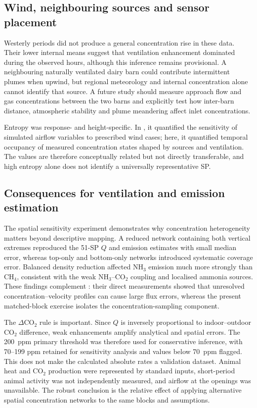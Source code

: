 ﻿\documentclass[12pt,a4paper]{article}
\begin{document}
\subsection{Wind, neighbouring sources and sensor placement}
Westerly periods did not produce a general concentration rise in these data. Their lower internal means suggest that ventilation enhancement dominated during the observed hours, although this inference remains provisional. A neighbouring naturally ventilated dairy barn could contribute intermittent plumes when upwind, but regional meteorology and internal concentration alone cannot identify that source. A future study should measure approach flow and gas concentrations between the two barns and explicitly test how inter-barn distance, atmospheric stability and plume meandering affect inlet concentrations.

Entropy was response- and height-specific. In \citet{Chen2026}, it quantified the sensitivity of simulated airflow variables to prescribed wind cases; here, it quantified temporal occupancy of measured concentration states shaped by sources and ventilation. The values are therefore conceptually related but not directly transferable, and high entropy alone does not identify a universally representative SP.

\subsection{Consequences for ventilation and emission estimation}
The spatial sensitivity experiment demonstrates why concentration heterogeneity matters beyond descriptive mapping. A reduced network containing both vertical extremes reproduced the 51-SP \(Q\) and emission estimates with small median error, whereas top-only and bottom-only networks introduced systematic coverage error. Balanced density reduction affected \(\mathrm{NH_3}\) emission much more strongly than \(\mathrm{CH_4}\), consistent with the weak \(\mathrm{NH_3}\)--\(\mathrm{CO_2}\) coupling and localised ammonia sources. These findings complement \citet{Janke2020}: their direct measurements showed that unresolved concentration--velocity profiles can cause large flux errors, whereas the present matched-block exercise isolates the concentration-sampling component.

The \(\Delta\mathrm{CO_2}\) rule is important. Since \(Q\) is inversely proportional to indoor--outdoor \(\mathrm{CO_2}\) difference, weak enhancements amplify analytical and spatial errors. The \SI{200}{ppm} primary threshold was therefore used for conservative inference, with 70--199 ppm retained for sensitivity analysis and values below \SI{70}{ppm} flagged. This does not make the calculated absolute rates a validation dataset. Animal heat and \(\mathrm{CO_2}\) production were represented by standard inputs, short-period animal activity was not independently measured, and airflow at the openings was unavailable. The robust conclusion is the relative effect of applying alternative spatial concentration networks to the same blocks and assumptions.
\end{document}
